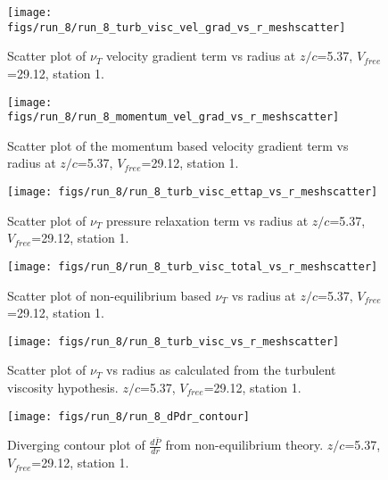 \begin{figure}[H]
\centering
\texttt{[image: figs/run\_8/run\_8\_turb\_visc\_vel\_grad\_vs\_r\_meshscatter]}
\caption{Scatter plot of $\nu_T$ velocity gradient term vs radius at $z/c$=5.37, $V_{free}$=29.12, station 1.}
\end{figure}


\begin{figure}[H]
\centering
\texttt{[image: figs/run\_8/run\_8\_momentum\_vel\_grad\_vs\_r\_meshscatter]}
\caption{Scatter plot of the momentum based velocity gradient term vs radius at $z/c$=5.37, $V_{free}$=29.12, station 1.}
\end{figure}


\begin{figure}[H]
\centering
\texttt{[image: figs/run\_8/run\_8\_turb\_visc\_ettap\_vs\_r\_meshscatter]}
\caption{Scatter plot of $\nu_T$ pressure relaxation term vs radius at $z/c$=5.37, $V_{free}$=29.12, station 1.}
\end{figure}


\begin{figure}[H]
\centering
\texttt{[image: figs/run\_8/run\_8\_turb\_visc\_total\_vs\_r\_meshscatter]}
\caption{Scatter plot of non-equilibrium based $\nu_T$ vs radius at $z/c$=5.37, $V_{free}$=29.12, station 1.}
\end{figure}


\begin{figure}[H]
\centering
\texttt{[image: figs/run\_8/run\_8\_turb\_visc\_vs\_r\_meshscatter]}
\caption{Scatter plot of $\nu_T$ vs radius as calculated from the turbulent viscosity hypothesis. $z/c$=5.37, $V_{free}$=29.12, station 1.}
\end{figure}


\begin{figure}[H]
\centering
\texttt{[image: figs/run\_8/run\_8\_dPdr\_contour]}
\caption{Diverging contour plot of $\frac{d\bar{P}}{dr}$ from non-equilibrium theory. $z/c$=5.37, $V_{free}$=29.12, station 1.}
\end{figure}


